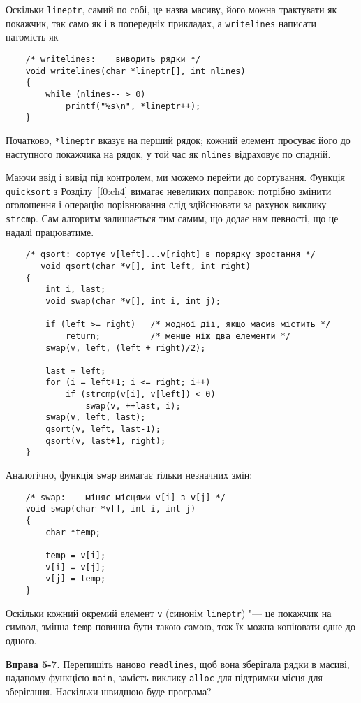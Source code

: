\documentclass[a4paper,12pt]{book}
\begin{document}
  Оскільки \texttt{lineptr}, самий по собі, це назва масиву, його можна трактувати як
  покажчик, так само як і в попередніх прикладах, а \texttt{writelines} написати натомість
  як
  \begin{verbatim}
    /* writelines:    виводить рядки */
    void writelines(char *lineptr[], int nlines)
    {
        while (nlines-- > 0)
            printf("%s\n", *lineptr++);
    }
  \end{verbatim}

  Початково, \texttt{*lineptr} вказує на перший рядок; кожний елемент просуває його до
  наступного покажчика на рядок, у той час як \texttt{nlines} відраховує по спадній.

  Маючи ввід і вивід під контролем, ми можемо перейти до сортування. Функція
  \texttt{quicksort} з Розділу~\ref{f0:ch4} вимагає невеликих поправок: потрібно
  змінити оголошення і операцію порівнювання слід здійснювати за рахунок виклику
  \texttt{strcmp}. Сам алгоритм залишається тим самим, що додає нам певності, що це надалі
  працюватиме.
  \begin{verbatim}
    /* qsort: сортує v[left]...v[right] в порядку зростання */
       void qsort(char *v[], int left, int right)
    {
        int i, last;
        void swap(char *v[], int i, int j);

        if (left >= right)   /* жодної дії, якщо масив містить */
            return;          /* менше ніж два елементи */
        swap(v, left, (left + right)/2);

        last = left;
        for (i = left+1; i <= right; i++)
            if (strcmp(v[i], v[left]) < 0)
                swap(v, ++last, i);
        swap(v, left, last);
        qsort(v, left, last-1);
        qsort(v, last+1, right);
    }
  \end{verbatim}

  Аналогічно, функція \texttt{swap} вимагає тільки незначних змін:
  \begin{verbatim}
    /* swap:    міняє місцями v[i] з v[j] */
    void swap(char *v[], int i, int j)
    {
        char *temp;

        temp = v[i];
        v[i] = v[j];
        v[j] = temp;
    }
  \end{verbatim}

  Оскільки кожний окремий елемент \texttt{v} (синонім \texttt{lineptr}) "--- це
  покажчик на символ, змінна \texttt{temp} повинна бути такою самою, тож їх можна
  копіювати одне до одного.

  \textbf{Вправа 5-7}. Перепишіть наново \texttt{readlines}, щоб вона зберігала рядки в
  масиві, наданому функцією \texttt{main}, замість виклику \texttt{alloc} для підтримки
  місця для зберігання. Наскільки швидшою буде програма?
\end{document}
